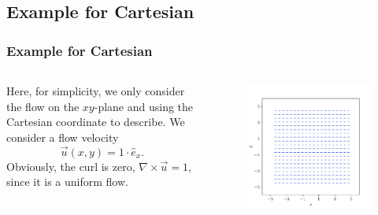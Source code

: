 \documentclass[11pt,]{beamer}
\begin{document}
\subsection{Example for Cartesian}
\begin{frame}
\frametitle{Example for Cartesian}
	\begin{columns}[t]
		\begin{column}{0.5\textwidth}
			Here, for simplicity, we only consider the flow on the $xy$-plane 
			and using the Cartesian coordinate to describe. We consider a flow velocity 
			\begin{equation}
			\vec{u}(x,y) = 1\cdot \hat{e}_x.
			\end{equation}
			Obviously, the curl is zero, $\nabla\times\vec{u} = 1$, 
			since it is a uniform flow.
		\end{column}
		\begin{column}{0.5\textwidth}
			\begin{figure}
			\includegraphics[page=1, width=1.0\textwidth]{flow-(1,0).pdf}
			\end{figure}
		\end{column}
	\end{columns}
\end{frame}
\end{document}
